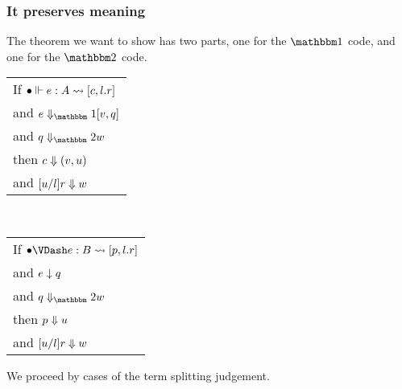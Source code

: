\documentclass{article}
\begin{document}
\subsubsection{It preserves meaning}

The theorem we want to show has two parts, one for the $\bbone$ code, and one for the $\bbtwo$ code.  
\begin{center}
\begin{tabular}{l}
If $\splitone [\emptyC]{e}{A}{c,l.r}$ \\
and $\rsone{e}{v}{q}$ \\
and $\reducetwo{q}{w}$ \\
then $\reduce{c}{\valprod{v}{u}}$ \\
and $\reduce{[u/l]r}{w}$
\end{tabular}
~~~
\begin{tabular}{l}
If $\splittwo[\emptyC]{e}{B}{p,l.r}$ \\
and $\rstwo{e}{q}$ \\
and $\reducetwo{q}{w}$ \\
then $\reduce{p}{u}$ \\
and $\reduce{[u/l]r}{w}$ 
\end{tabular}
\end{center}

We proceed by cases of the term splitting judgement.
\end{document}
